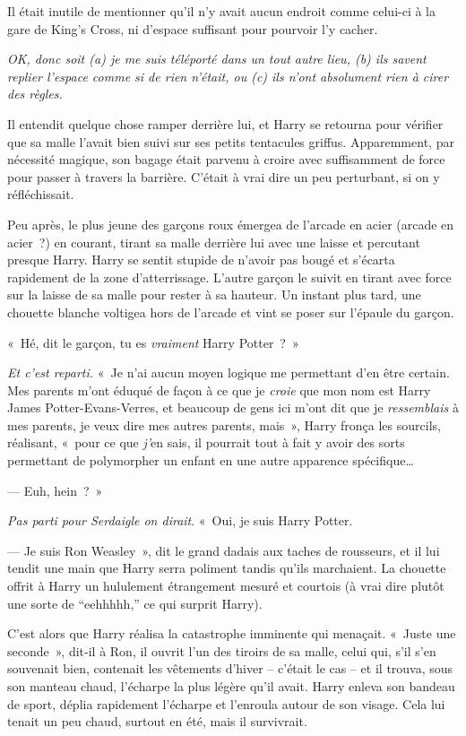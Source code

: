 Il était inutile de mentionner qu'il n'y avait aucun endroit comme celui-ci à la gare de King's Cross, ni d'espace suffisant pour pourvoir l'y cacher.

\emph{OK, donc soit (a) je me suis téléporté dans un tout autre lieu, (b) ils savent replier l'espace comme si de rien n'était, ou (c) ils n'ont absolument rien à cirer des règles.}

Il entendit quelque chose ramper derrière lui, et Harry se retourna pour vérifier que sa malle l'avait bien suivi sur ses petits tentacules griffus.
Apparemment, par nécessité magique, son bagage était parvenu à croire avec suffisamment de force pour passer à travers la barrière.
C'était à vrai dire un peu perturbant, si on y réfléchissait.

Peu après, le plus jeune des garçons roux émergea de l'arcade en acier (arcade en acier~?) en courant, tirant sa malle derrière lui avec une laisse et percutant presque Harry.
Harry se sentit stupide de n'avoir pas bougé et s'écarta rapidement de la zone d'atterrissage.
L'autre garçon le suivit en tirant avec force sur la laisse de sa malle pour rester à sa hauteur.
Un instant plus tard, une chouette blanche voltigea hors de l'arcade et vint se poser sur l'épaule du garçon.

«~Hé, dit le garçon, tu es \emph{vraiment} Harry Potter~?~»

\emph{Et c'est reparti.}
«~Je n'ai aucun moyen logique me permettant d'en être certain.
Mes parents m'ont éduqué de façon à ce que je \emph{croie} que mon nom est Harry James Potter-Evans-Verres, et beaucoup de gens ici m'ont dit que je \emph{ressemblais} à mes parents, je veux dire mes autres parents, mais~», Harry fronça les sourcils, réalisant, «~pour ce que \emph{j'}en sais, il pourrait tout à fait y avoir des sorts permettant de polymorpher un enfant en une autre apparence spécifique…

--- Euh, hein~?~»

\emph{Pas parti pour Serdaigle on dirait}. «~Oui, je suis Harry Potter.

--- Je suis Ron Weasley~», dit le grand dadais aux taches de rousseurs, et il lui tendit une main que Harry serra poliment tandis qu'ils marchaient.
La chouette offrit à Harry un hululement étrangement mesuré et courtois (à vrai dire plutôt une sorte de “eehhhhh,” ce qui surprit Harry).

C'est alors que Harry réalisa la catastrophe imminente qui menaçait.
«~Juste une seconde~», dit-il à Ron, il ouvrit l'un des tiroirs de sa malle, celui qui, s'il s'en souvenait bien, contenait les vêtements d'hiver -- c'était le cas -- et il trouva, sous son manteau chaud, l'écharpe la plus légère qu'il avait.
Harry enleva son bandeau de sport, déplia rapidement l'écharpe et l'enroula autour de son visage.
Cela lui tenait un peu chaud, surtout en été, mais il survivrait.

